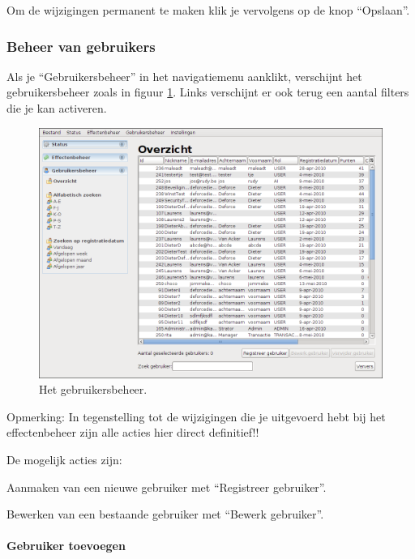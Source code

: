 Om de wijzigingen permanent te maken klik je vervolgens op de knop ``Opslaan''.

\subsubsection{Beheer van gebruikers}
\label{sec:handl:admin:gebruikers}

Als je ``Gebruikersbeheer'' in het navigatiemenu aanklikt, verschijnt het gebruikersbeheer zoals in figuur \ref{fig:handl:admin:gebruikers-overzicht}.
Links verschijnt er ook terug een aantal filters die je kan activeren.

\begin{figure}[h!]
	\centering
		\includegraphics[width=\textwidth]{images/handleiding/administratie/gebruikers-overzicht}
	\caption{Het gebruikersbeheer.}
		\label{fig:handl:admin:gebruikers-overzicht}
\end{figure}

Opmerking: In tegenstelling tot de wijzigingen die je uitgevoerd hebt bij het effectenbeheer zijn alle acties hier direct definitief!!

De mogelijk acties zijn:
\begin{itemize_compact}
\item{Aanmaken van een nieuwe gebruiker met ``Registreer gebruiker''.}
\item{Bewerken van een bestaande gebruiker met ``Bewerk gebruiker''.}
\end{itemize_compact}

\paragraph{Gebruiker toevoegen}

